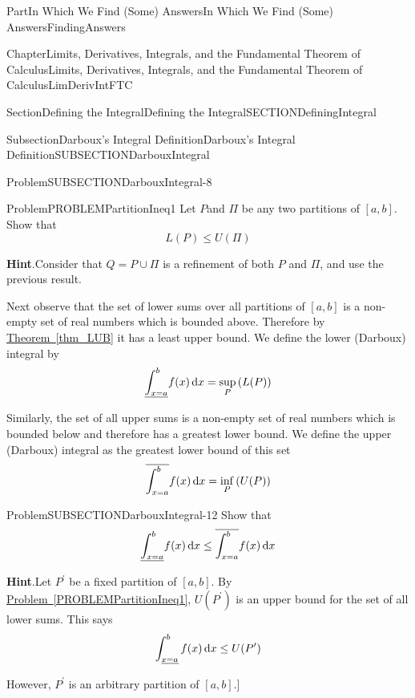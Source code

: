 \documentclass[oneside,10pt,]{book}
\newcommand{\blocktitlefont}{\relax}
\newcommand{\xreffont}{\relax}
\numberwithin{equation}{part}
\newcommand{\dx}[1]{\,{\rm d}#1}
\begin{document}
\begin{partptx}{Part}{In Which We Find (Some) Answers}{}{In Which We Find (Some) Answers}{}{}{FindingAnswers}
\begin{chapterptx}{Chapter}{Limits, Derivatives, Integrals, and the Fundamental Theorem of Calculus}{}{Limits, Derivatives, Integrals, and the Fundamental Theorem of Calculus}{}{}{LimDerivIntFTC}
\begin{sectionptx}{Section}{Defining the Integral}{}{Defining the Integral}{}{}{SECTIONDefiningIntegral}
\begin{subsectionptx}{Subsection}{Darboux's Integral Definition}{}{Darboux's Integral Definition}{}{}{SUBSECTIONDarbouxIntegral}
\begin{problem}{Problem}{}{SUBSECTIONDarbouxIntegral-8}
\begin{enumerate}[font=\bfseries,label=(\alph*),ref=\alph*]
\end{enumerate}%
\end{problem}
\begin{problem}{Problem}{}{PROBLEMPartitionIneq1}%
Let \(P \)and \(\Pi \) be any two partitions of \([a,b]\).  Show that%
\begin{equation*}
L\left(P\right)\le
U(\Pi{})
\end{equation*}
%
\par\smallskip%
\noindent\textbf{\blocktitlefont Hint}.\hypertarget{PROBLEMPartitionIneq1-2}{}\quad{}Consider that \(Q=P\cup \Pi \) is a refinement of both \(P\) and \(\Pi \), and use the previous result.%
\end{problem}
Next observe  that the set of lower sums over all partitions of \([a,b]\) is a non-empty set of real numbers which is bounded above.  Therefore by \hyperref[thm_LUB]{Theorem~{\xreffont\ref{thm_LUB}}}  it has a least upper bound.  We define the lower (Darboux) integral by%
\begin{equation*}
\underline{\int^b_{x=a}}{f(x)}\dx{x}=\sup_{P}
\left(L(P)\right)
\end{equation*}
%
\par
Similarly, the set of all upper sums is a non-empty set of real numbers which is bounded below and therefore has a greatest lower bound. We define the upper (Darboux) integral as the greatest lower bound of this set%
\begin{equation*}
\overline{\int^{b}_{x=a}}{f(x)\dx{x}}=\inf_{P} \left(U(P)\right)
\end{equation*}
%
\begin{problem}{Problem}{}{SUBSECTIONDarbouxIntegral-12}%
Show that%
\begin{equation*}
\underline{\int^b_{x=a}}{f(x)}\dx{x}\le
\overline{\int^{b}_{x=a}}{f(x)\dx{x}}
\end{equation*}
%
\par\smallskip%
\noindent\textbf{\blocktitlefont Hint}.\hypertarget{SUBSECTIONDarbouxIntegral-12-2}{}\quad{}Let \(P^\prime\) be a fixed partition of \([a,b]\). By \hyperref[PROBLEMPartitionIneq1]{Problem~{\xreffont\ref{PROBLEMPartitionIneq1}}}, \(U(P^\prime)\) is an upper bound for the set of all lower sums.  This says%
\begin{equation*}
\int^b_{\underline{  x=a
}}{f(x)}\dx{x}\le U(P^\prime)
\end{equation*}
%
\par
However, \(P^\prime\) is an arbitrary partition of \([a,b]\).]%
\end{problem}

\end{subsectionptx}
\end{sectionptx}
\end{chapterptx}
\end{partptx}
\end{document}
